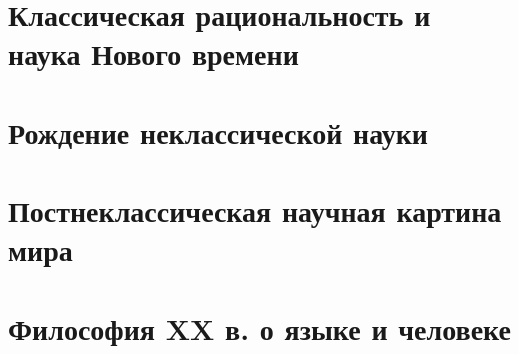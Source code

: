 \documentclass[a4paper, 12pt, notitlepage]{report}
\begin{document}
\chapter{Классическая рациональность и наука Нового времени}


\chapter{Рождение неклассической науки}



\chapter{Постнеклассическая научная картина мира}


\chapter{Философия XX в. о языке и человеке}


%
\end{document}
